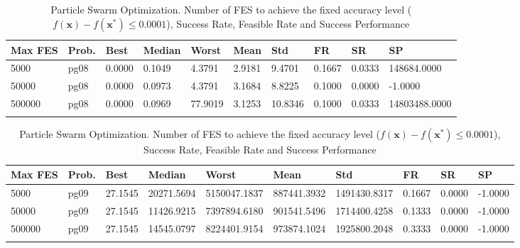 \documentclass[10pt, a4paper]{book}
\begin{document}
\begin{center}
\begin{longtable}{l l l l l l l l l l}
\textbf{Max FES} & \textbf{Prob.} & \textbf{Best} & \textbf{Median} & \textbf{Worst} & \textbf{Mean} & \textbf{Std} & \textbf{FR} & \textbf{SR} & \textbf{SP} \\
\hline
5000 & pg08 & 0.0000 & 0.1049 & 4.3791 & 2.9181 & 9.4701 & 0.1667 & 0.0333 & 148684.0000 \\
50000 & pg08 & 0.0000 & 0.0973 & 4.3791 & 3.1684 & 8.8225 & 0.1000 & 0.0000 & -1.0000 \\
500000 & pg08 & 0.0000 & 0.0969 & 77.9019 & 3.1253 & 10.8346 & 0.1000 & 0.0333 & 14803488.0000 \\

\caption{ Particle Swarm Optimization. Number of FES to achieve the fixed accuracy level ($f(\mathbf{x}) - f(\mathbf{x}^{*}) \leq 0.0001$), Success Rate, Feasible Rate and Success Performance }
\end{longtable}
\end{center}

\begin{center}
\begin{longtable}{l l l l l l l l l l}
\textbf{Max FES} & \textbf{Prob.} & \textbf{Best} & \textbf{Median} & \textbf{Worst} & \textbf{Mean} & \textbf{Std} & \textbf{FR} & \textbf{SR} & \textbf{SP} \\
\hline
5000 & pg09 & 27.1545 & 20271.5694 & 5150047.1837 & 887441.3932 & 1491430.8317 & 0.1667 & 0.0000 & -1.0000 \\
50000 & pg09 & 27.1545 & 11426.9215 & 7397894.6180 & 901541.5496 & 1714400.4258 & 0.1333 & 0.0000 & -1.0000 \\
500000 & pg09 & 27.1545 & 14545.0797 & 8224401.9154 & 973874.1024 & 1925800.2048 & 0.3333 & 0.0000 & -1.0000 \\

\caption{ Particle Swarm Optimization. Number of FES to achieve the fixed accuracy level ($f(\mathbf{x}) - f(\mathbf{x}^{*}) \leq 0.0001$), Success Rate, Feasible Rate and Success Performance }
\end{longtable}
\end{center}
\end{document}
